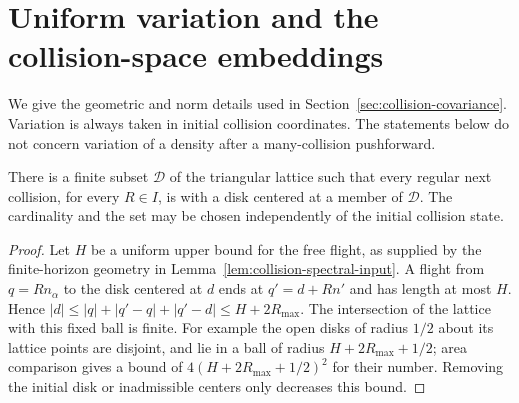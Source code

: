 \section{Uniform variation and the collision-space embeddings}
\label{app:bv-details}
We give the geometric and norm details used in
Section~\ref{sec:collision-covariance}. Variation is always taken in
initial collision coordinates. The statements below do not concern
variation of a density after a many-collision pushforward.

\begin{lemma}
\label{lem:finite-next-centers}
There is a finite subset $\mathcal D$ of the triangular lattice such
that every regular next collision, for every $R\in I$, is with a disk
centered at a member of $\mathcal D$. The cardinality and the set may
be chosen independently of the initial collision state.
\end{lemma}
\begin{proof}
Let $H$ be a uniform upper bound for the free flight, as supplied by the
finite-horizon geometry in Lemma~\ref{lem:collision-spectral-input}.
A flight from $q=Rn_\alpha$ to the disk centered at $d$ ends at
$q'=d+Rn'$ and has length at most $H$. Hence
$|d|\le |q|+|q'-q|+|q'-d|\le H+2R_{\max}$.
The intersection of the lattice with this fixed ball is finite. For
example the open disks of radius $1/2$ about its lattice points are
disjoint, and lie in a ball of radius $H+2R_{\max}+1/2$; area comparison
gives a bound of $4(H+2R_{\max}+1/2)^2$ for their number. Removing the
initial disk or inadmissible centers only decreases this bound.
\end{proof}

